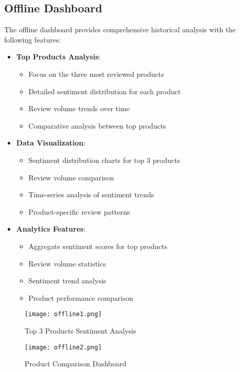 \documentclass[11pt,a4paper,twocolumn]{article}
\begin{document}
\subsection{Offline Dashboard}
The offline dashboard provides comprehensive historical analysis with the following features:
\begin{itemize}
    \item \textbf{Top Products Analysis}:
    \begin{itemize}
        \item Focus on the three most reviewed products
        \item Detailed sentiment distribution for each product
        \item Review volume trends over time
        \item Comparative analysis between top products
    \end{itemize}
    
    \item \textbf{Data Visualization}:
    \begin{itemize}
        \item Sentiment distribution charts for top 3 products
        \item Review volume comparison
        \item Time-series analysis of sentiment trends
        \item Product-specific review patterns
    \end{itemize}
    
    \item \textbf{Analytics Features}:
    \begin{itemize}
        \item Aggregate sentiment scores for top products
        \item Review volume statistics
        \item Sentiment trend analysis
        \item Product performance comparison
    \end{itemize}
\end{itemize}

\begin{figure}[H]
    \centering
    \texttt{[image: offline1.png]}
    \caption{Top 3 Products Sentiment Analysis}
    \label{fig:offline1}
\end{figure}
\begin{figure}[H]
    \centering
    \texttt{[image: offline2.png]}
    \caption{Product Comparison Dashboard}
    \label{fig:offline2}
\end{figure}
\end{document}
